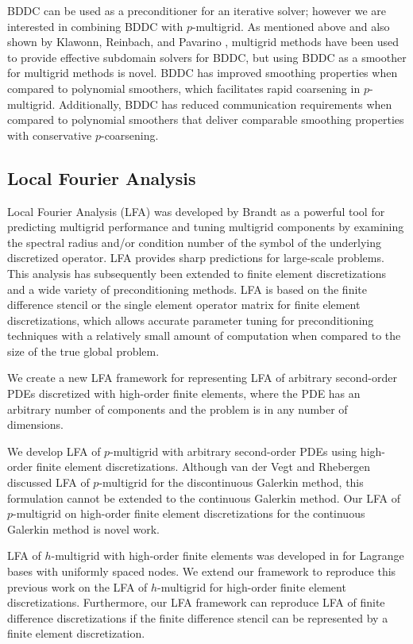 BDDC can be used as a preconditioner for an iterative solver; however we are interested in combining BDDC with $p$-multigrid.
As mentioned above and also shown by Klawonn, Reinbach, and Pavarino \cite{klawonn2008exact}, multigrid methods have been used to provide effective subdomain solvers for BDDC, but using BDDC as a smoother for multigrid methods is novel.
BDDC has improved smoothing properties when compared to polynomial smoothers, which facilitates rapid coarsening in $p$-multigrid.
Additionally, BDDC has reduced communication requirements when compared to polynomial smoothers that deliver comparable smoothing properties with conservative $p$-coarsening.

\subsection{Local Fourier Analysis}

Local Fourier Analysis (LFA) was developed by Brandt \cite{brandt1977multi,wienands2004practical} as a powerful tool for predicting multigrid performance and tuning multigrid components by examining the spectral radius and/or condition number of the symbol of the underlying discretized operator.
LFA provides sharp predictions for large-scale problems.
This analysis has subsequently been extended to finite element discretizations and a wide variety of preconditioning methods.
LFA is based on the finite difference stencil or the single element operator matrix for finite element discretizations, which allows accurate parameter tuning for preconditioning techniques with a relatively small amount of computation when compared to the size of the true global problem.

We create a new LFA framework for representing LFA of arbitrary second-order PDEs discretized with high-order finite elements, where the PDE has an arbitrary number of components and the problem is in any number of dimensions.

We develop LFA of $p$-multigrid with arbitrary second-order PDEs using high-order finite element discretizations.
Although van der Vegt and Rhebergen \cite{van2011discrete} discussed LFA of $p$-multigrid for the discontinuous Galerkin method, this formulation cannot be extended to the continuous Galerkin method.
Our LFA of $p$-multigrid on high-order finite element discretizations for the continuous Galerkin method is novel work.

LFA of $h$-multigrid with high-order finite elements was developed in \cite{he2020two} for Lagrange bases with uniformly spaced nodes.
We extend our framework to reproduce this previous work on the LFA of $h$-multigrid for high-order finite element discretizations.
Furthermore, our LFA framework can reproduce LFA of finite difference discretizations if the finite difference stencil can be represented by a finite element discretization.

